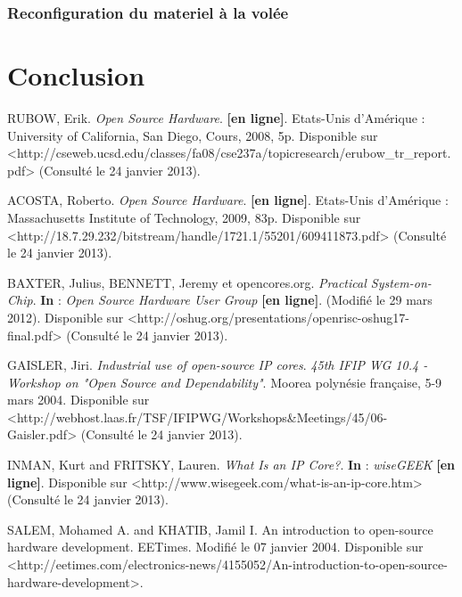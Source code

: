 \documentclass{report}
\begin{document}
\subsection{Reconfiguration du materiel à la volée}

\newpage

\chapter*{Conclusion}




\begin{thebibliography}{1}
  
RUBOW, Erik. \textit{Open Source Hardware}. \textbf{[en ligne]}. Etats-Unis d'Amérique : University of California, San Diego, Cours, 2008, 5p. Disponible sur <http://cseweb.ucsd.edu/classes/fa08/cse237a/topicresearch/erubow\_tr\_report.pdf> (Consulté le 24 janvier 2013).

ACOSTA, Roberto. \textit{Open Source Hardware}. \textbf{[en ligne]}. Etats-Unis d'Amérique : Massachusetts Institute of Technology, 2009, 83p. Disponible sur <http://18.7.29.232/bitstream/handle/1721.1/55201/609411873.pdf> (Consulté le 24 janvier 2013).

BAXTER, Julius, BENNETT, Jeremy et opencores.org. \textit{Practical System-on-Chip}. \textbf{In} : \textit{Open Source Hardware User Group} \textbf{[en ligne]}. (Modifié le 29 mars 2012). Disponible sur <http://oshug.org/presentations/openrisc-oshug17-final.pdf> (Consulté le 24 janvier 2013).

GAISLER, Jiri. \textit{Industrial use of open-source IP cores}. \textit{45th IFIP WG 10.4 - Workshop on "Open Source and Dependability"}. Moorea polynésie française, 5-9 mars 2004. Disponible sur <http://webhost.laas.fr/TSF/IFIPWG/Workshops\&Meetings/45/06-Gaisler.pdf> (Consulté le 24 janvier 2013).

INMAN, Kurt and FRITSKY, Lauren. \textit{What Is an IP Core?}. \textbf{In} : \textit{wiseGEEK} \textbf{[en ligne]}. Disponible sur <http://www.wisegeek.com/what-is-an-ip-core.htm> (Consulté le 24 janvier 2013).

SALEM, Mohamed A. and KHATIB, Jamil I. An introduction to open-source hardware development. EETimes. Modifié le 07 janvier 2004. Disponible sur <http://eetimes.com/electronics-news/4155052/An-introduction-to-open-source-hardware-development>.


\end{thebibliography}
\end{document}

